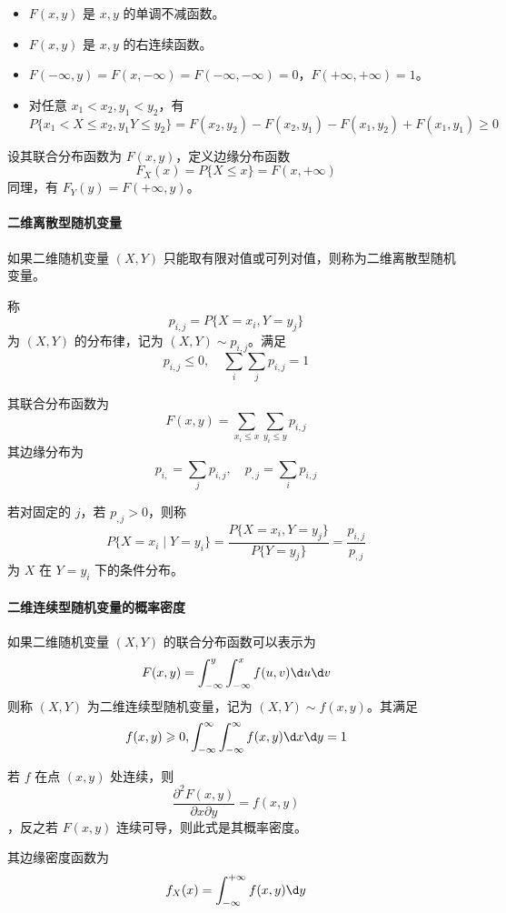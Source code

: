 \begin{itemize}
	\item $F(x, y)$ 是 $x, y$ 的单调不减函数。
	\item $F(x, y)$ 是 $x, y$ 的右连续函数。
	\item $F(-\infty, y) = F(x, -\infty) = F(-\infty, -\infty) = 0$，$F(+\infty, +\infty) = 1$。
	\item 对任意 $x_1 < x_2, y_1 < y_2$，有
	\[ P\{x_1 < X \leqslant x_2, y_1 Y \leqslant y_2\} = F(x_2, y_2) - F(x_2, y_1) - F(x_1, y_2) + F(x_1, y_1) \geqslant 0 \]
\end{itemize}

设其联合分布函数为 $F(x,y)$，定义边缘分布函数
\[ F_X(x) = P\{X \leqslant x\} = F(x, +\infty) \]
同理，有 $F_Y(y) = F(+\infty, y)$。

\paragraph{二维离散型随机变量} 如果二维随机变量 $(X, Y)$ 只能取有限对值或可列对值，则称为二维离散型随机变量。

称
\[ p_{i,j} = P\{X= x_i, Y = y_j\} \]
为 $(X, Y)$ 的分布律，记为 $(X,Y) \sim p_{i,j}$。满足
\[ p_{i,j} \leqslant 0, \quad \sum_i \sum_j p_{i,j} = 1 \]

其联合分布函数为
\[ F(x, y) = \sum_{x_i \leqslant x} \sum_{y_i \leqslant y} p_{i, j} \]
其边缘分布为
\[ p_{i, } = \sum_{j} p_{i, j}, \quad p_{,j} = \sum_{i} p_{i,j} \]


若对固定的 $j$，若 $p_{, j} > 0$，则称
\[ P\{ X = x_i \mid Y = y_i \} = \frac{P\{X = x_i, Y = y_j\}}{P\{Y=y_j\}} = \frac{p_{i, j}}{p_{, j}} \]
为 $X$ 在 $Y = y_i$ 下的条件分布。

\paragraph{二维连续型随机变量的概率密度}

如果二维随机变量 $(X, Y)$ 的联合分布函数可以表示为
\[ F(x, y) = \int_{-\infty}^{y} \int_{-\infty}^{x} f(u, v) \d u \d v \]
则称 $(X, Y)$ 为二维连续型随机变量，记为 $(X, Y) \sim f(x, y)$。其满足
\[ f(x, y) \geqslant 0, \int_{-\infty}^{\infty} \int_{-\infty}^{\infty} f(x, y) \d x \d y = 1 \]

若 $f$ 在点 $(x, y)$ 处连续，则
\[ \frac{\partial^2 F(x, y)}{\partial x \partial y} = f(x, y) \]，反之若 $F(x, y)$ 连续可导，则此式是其概率密度。

其边缘密度函数为
\[ f_X(x) = \int_{-\infty}^{+\infty} f(x, y) \d y \]

